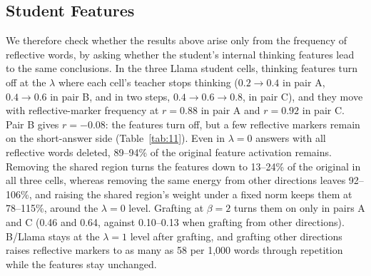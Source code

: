 \begin{table}[t]
\centering
\small

\caption{Reflective-marker frequency and response length when the weight of the shared region is increased while the norm of the $\lambda=0$ adapter is kept fixed. $\gamma$ is the coefficient on the added shared-region component, and All in region moves the entire update into the shared region. The table tests whether thinking increases as the region is scaled up. Values after $\pm$ are standard deviations across three seeds.}
\label{tab:10}
\end{table}

\subsection{Student Features}\label{sec:sae}

We therefore check whether the results above arise only from the frequency of reflective words, by asking whether the student's internal thinking features lead to the same conclusions. In the three Llama student cells, thinking features turn off at the $\lambda$ where each cell's teacher stops thinking ($0.2 \to 0.4$ in pair A, $0.4 \to 0.6$ in pair B, and in two steps, $0.4 \to 0.6 \to 0.8$, in pair C), and they move with reflective-marker frequency at $r = 0.88$ in pair A and $r = 0.92$ in pair C. Pair B gives $r = -0.08$: the features turn off, but a few reflective markers remain on the short-answer side (Table~\ref{tab:11}). Even in $\lambda=0$ answers with all reflective words deleted, 89--94\% of the original feature activation remains. Removing the shared region turns the features down to 13--24\% of the original in all three cells, whereas removing the same energy from other directions leaves 92--106\%, and raising the shared region's weight under a fixed norm keeps them at 78--115\%, around the $\lambda=0$ level. Grafting at $\beta=2$ turns them on only in pairs A and C (0.46 and 0.64, against 0.10--0.13 when grafting from other directions). B/Llama stays at the $\lambda=1$ level after grafting, and grafting other directions raises reflective markers to as many as 58 per 1,000 words through repetition while the features stay unchanged.

